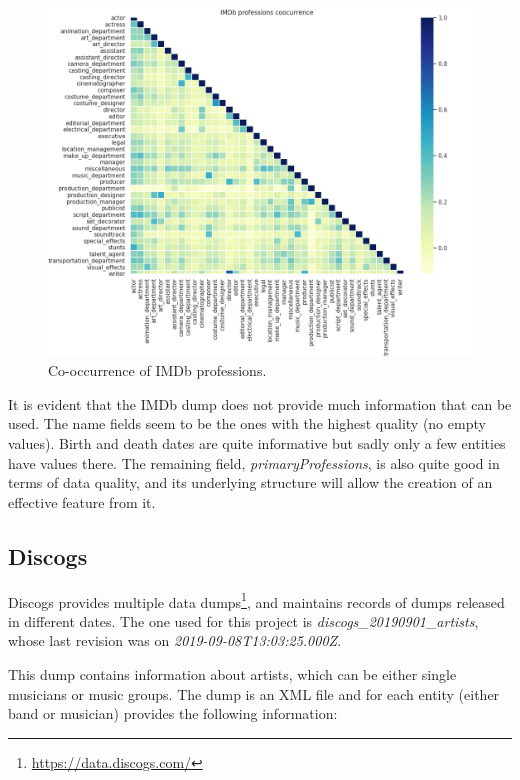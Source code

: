 \documentclass[epsfig,a4paper,11pt,titlepage,twoside,openany]{book}
\newcommand{\footurl}[1]{\footnote{\url{#1}}}
\begin{document}
\begin{figure}[H]
  \centering \includegraphics[width=\textwidth]{imdb_profession_coorcurrence}
  \caption{Co-occurrence of IMDb professions.}
  \label{fig:imdb-profession-coocurrence-heatmap}
\end{figure}

It is evident that the IMDb dump does not provide much information that can be used. The name fields seem to be the ones with the highest quality (no empty values). Birth and death dates are quite informative but sadly only a few entities have values there. The remaining field, \textit{primaryProfessions}, is also quite good in terms of data quality, and its underlying structure will allow the creation of an effective feature from it.



\subsection{Discogs}
\label{sec:shape-discogs}

Discogs provides multiple data dumps\footurl{https://data.discogs.com/}, and maintains records of dumps released in different dates. The one used for this project is \textit{discogs\_20190901\_artists}, whose last revision was on \textit{2019-09-08T13:03:25.000Z}.

This dump contains information about artists, which can be either single musicians or music groups. The dump is an XML file and for each entity (either band or musician) provides the following information:
\end{document}
